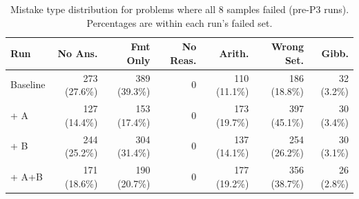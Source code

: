 \begin{table}[H]
\centering
\small
\begin{tabular}{lrrrrrr}
\toprule
\textbf{Run} & \textbf{No Ans.} & \textbf{Fmt Only} & \textbf{No Reas.} & \textbf{Arith.} & \textbf{Wrong Set.} & \textbf{Gibb.} \\
\midrule
Baseline & 273 (27.6\%) & 389 (39.3\%) & 0 & 110 (11.1\%) & 186 (18.8\%) & 32 (3.2\%) \\
\midrule
+ A & 127 (14.4\%) & 153 (17.4\%) & 0 & 173 (19.7\%) & 397 (45.1\%) & 30 (3.4\%) \\
+ B & 244 (25.2\%) & 304 (31.4\%) & 0 & 137 (14.1\%) & 254 (26.2\%) & 30 (3.1\%) \\
+ A+B & 171 (18.6\%) & 190 (20.7\%) & 0 & 177 (19.2\%) & 356 (38.7\%) & 26 (2.8\%) \\
\bottomrule
\end{tabular}
\caption{Mistake type distribution for problems where all 8 samples failed (pre-P3 runs). Percentages are within each run's failed set.}
\label{tab:p4-errors}
\end{table}
